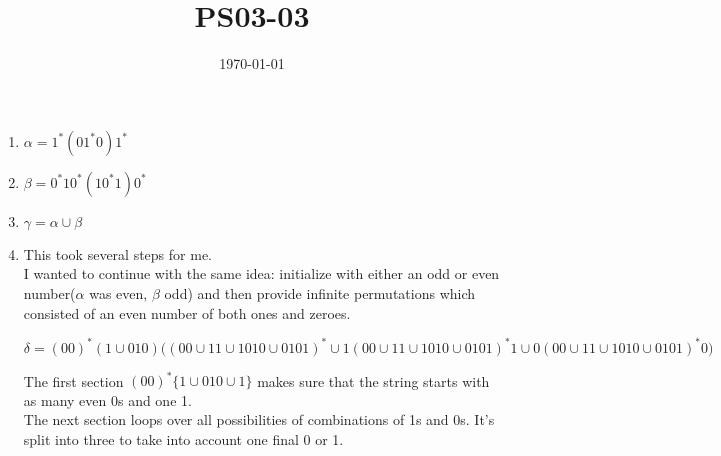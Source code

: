 \documentclass{article}
\title{PS03-03}
\date{\today}
\begin{document}
\maketitle

\begin{enumerate}[label=\alph*.]
	\item $\alpha = 1^*(01^*0)1^*$
	\item $\beta = 0^*10^*(10^*1)0^*$
	\item $\gamma = \alpha \cup \beta$
	\item This took several steps for me.\\
	I wanted to continue with the same idea: initialize with
	either an odd or even number($\alpha$ was even, $\beta$ odd)
	and then provide infinite permutations which consisted of an even number of both ones and zeroes.

	$\delta = (00)^*(1 \cup 010)\big(
	(00 \cup 11 \cup 1010 \cup 0101)^*\cup
	1(00 \cup 11 \cup 1010 \cup 0101)^*1\cup
	0(00 \cup 11 \cup 1010 \cup 0101)^*0\big)$

	The first section $(00)^*\{1 \cup 010 \cup 1\}$ makes sure
	that the string starts with as many even 0s and one 1.\\
	The next section loops over all possibilities of combinations of 1s and 0s. It's split into three to take into account one final 0 or 1.

\end{enumerate}
\end{document}
